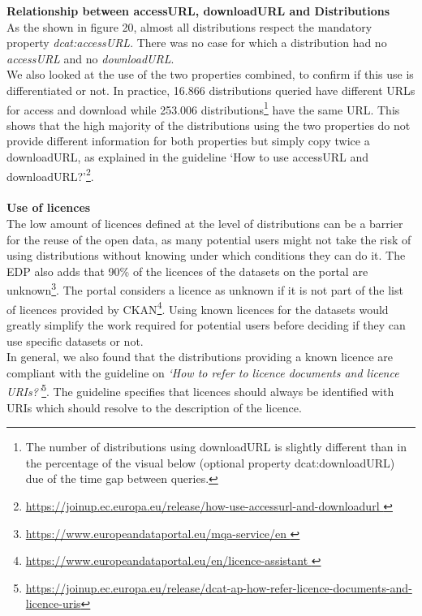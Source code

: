 \documentclass[<options>]{elsarticle}
\begin{document}
\textbf{Relationship between accessURL, downloadURL and Distributions}\\
As the shown in figure 20, almost all distributions respect the mandatory property \textit{dcat:accessURL}. There was no case for which a distribution had no \textit{accessURL} and no \textit{downloadURL}.\\
We also looked at the use of the two properties combined, to confirm if this use is differentiated or not. In practice, 16.866 distributions queried have different URLs for access and download while 253.006 distributions\footnote{The number of distributions using downloadURL is slightly different than in the percentage of the visual below (optional property dcat:downloadURL) due of the time gap between queries.}  have the same URL. This shows that the high majority of the distributions using the two properties do not provide different information for both properties but simply copy twice a downloadURL, as explained in the guideline ‘How to use accessURL and downloadURL?’\footnote{\href{   https://joinup.ec.europa.eu/release/how-use-accessurl-and-downloadurl }{https://joinup.ec.europa.eu/release/how-use-accessurl-and-downloadurl }}.
\\
\\
\textbf{Use of licences}\\
The low amount of licences defined at the level of distributions can be a barrier for the reuse of the open data, as many potential users might not take the risk of using distributions without knowing under which conditions they can do it. The EDP also adds that 90\% of the licences of the datasets on the portal are unknown\footnote{\href{https://www.europeandataportal.eu/mqa-service/en}{ https://www.europeandataportal.eu/mqa-service/en }}. The portal considers a licence as unknown if it is not part of the list of licences provided by CKAN\footnote{\href{https://www.europeandataportal.eu/en/licence-assistant}{ https://www.europeandataportal.eu/en/licence-assistant }}. Using known licences for the datasets would greatly simplify the work required for potential users before deciding if they can use specific datasets or not.\\
In general, we also found that the distributions providing a known licence are compliant with the guideline on \textit{‘How to refer to licence documents and licence URIs?’}\footnote{\href{https://joinup.ec.europa.eu/release/dcat-ap-how-refer-licence-documents-and-licence-uris}{  https://joinup.ec.europa.eu/release/dcat-ap-how-refer-licence-documents-and-licence-uris}}. The guideline specifies that licences should always be identified with URIs which should resolve to the description of the licence.
\end{document}
